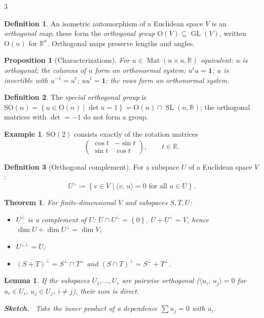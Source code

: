\documentclass[10pt,a4paper,landscape]{article}
\theoremstyle{definition}
\newtheorem{defn}{Definition}[section]
\newtheorem{exm}{Example}[section]
\theoremstyle{plain}
\newtheorem{thm}{Theorem}[section]
\newtheorem{lem}{Lemma}[section]
\newtheorem{prop}{Proposition}[section]
\theoremstyle{remark}
\newcommand{\R}{\mathbb{R}}
\newcommand{\set}[1]{\left\{ #1 \right\}}
\newcommand{\deq}{\coloneqq}
\DeclareMathOperator{\Mat}{Mat}
\DeclareMathOperator{\GL}{GL}
\DeclareMathOperator{\SLgrp}{SL}
\newcommand{\On}{\mathrm{O}}
\newcommand{\SOn}{\mathrm{SO}}
\newcommand{\ip}[2]{\langle #1,\, #2 \rangle}
\newcommand{\one}{\mathbf{1}}
\newenvironment{proofsketch}{%
  \par\small\color{exgray}\textbf{Sketch.}\ }%
  {\par}
\begin{document}
\begin{multicols*}{3}
\begin{defn}
An isometric automorphism of a Euclidean space $V$ is an \emph{orthogonal map}; these form the \emph{orthogonal group} $\On(V) \subseteq \GL(V)$, written $\On(n)$ for $\R^n$. Orthogonal maps preserve lengths and angles.
\end{defn}

\begin{prop}[Characterizations]
For $u \in \Mat(n \times n, \R)$ equivalent: $u$ is orthogonal; the columns of $u$ form an orthonormal system; $u^t u = \one$; $u$ is invertible with $u^{-1} = u^t$; $u u^t = \one$; the rows form an orthonormal system.
\end{prop}

\begin{defn}
The \emph{special orthogonal group} is $\SOn(n) = \set{u \in \On(n) \mid \det u = 1} = \On(n) \cap \SLgrp(n,\R)$; the orthogonal matrices with $\det = -1$ do not form a group.
\end{defn}

\begin{exm}
$\SOn(2)$ consists exactly of the rotation matrices
\[
\begin{pmatrix} \cos t & -\sin t \\ \sin t & \cos t \end{pmatrix}, \qquad t \in \R .
\]
\end{exm}

\begin{defn}[Orthogonal complement]
For a subspace $U$ of a Euclidean space $V$:
\[
U^{\bot} \deq \set{v \in V \mid \ip{v}{u} = 0 \text{ for all } u \in U}.
\]
\end{defn}

\begin{thm}
For finite-dimensional $V$ and subspaces $S, T, U$:
\begin{itemize}
\item $U^{\bot}$ is a complement of $U$: $U \cap U^{\bot} = \set{0}$, $U + U^{\bot} = V$, hence $\dim U + \dim U^{\bot} = \dim V$;
\item $U^{\bot\bot} = U$;
\item $(S + T)^{\bot} = S^{\bot} \cap T^{\bot}$ and $(S \cap T)^{\bot} = S^{\bot} + T^{\bot}$.
\end{itemize}
\end{thm}

\begin{lem}
If the subspaces $U_1, \dots, U_r$ are pairwise orthogonal ($\ip{u_i}{u_j} = 0$ for $u_i \in U_i$, $u_j \in U_j$, $i \neq j$), their sum is direct.
\begin{proofsketch}
Take the inner product of a dependence $\sum u_j = 0$ with $u_i$.
\end{proofsketch}
\end{lem}


\end{multicols*}
\end{document}
